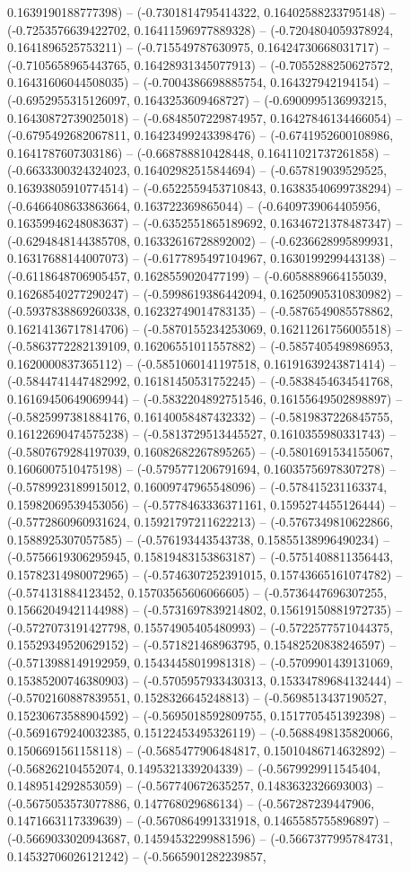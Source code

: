 0.1639190188777398) -- (-0.7301814795414322, 0.16402588233795148) -- (-0.7253576639422702, 0.16411596977889328) -- (-0.7204804059378924, 0.1641896525753211) -- (-0.715549787630975, 0.16424730668031717) -- (-0.7105658965443765, 0.16428931345077913) -- (-0.7055288250627572, 0.16431606044508035) -- (-0.7004386698885754, 0.164327942194154) -- (-0.6952955315126097, 0.1643253609468727) -- (-0.6900995136993215, 0.16430872739025018) -- (-0.6848507229874957, 0.16427846134466054) -- (-0.6795492682067811, 0.16423499243398476) -- (-0.6741952600108986, 0.1641787607303186) -- (-0.668788810428448, 0.16411021737261858) -- (-0.6633300324324023, 0.16402982515844694) -- (-0.657819039529525, 0.16393805910774514) -- (-0.6522559453710843, 0.16383540699738294) -- (-0.6466408633863664, 0.163722369865044) -- (-0.6409739064405956, 0.16359946248083637) -- (-0.6352551865189692, 0.16346721378487347) -- (-0.6294848144385708, 0.16332616728892002) -- (-0.6236628995899931, 0.16317688144007073) -- (-0.6177895497104967, 0.1630199299443138) -- (-0.6118648706905457, 0.1628559020477199) -- (-0.6058889664155039, 0.16268540277290247) -- (-0.5998619386442094, 0.16250905310830982) -- (-0.5937838869260338, 0.16232749014783135) -- (-0.5876549085578862, 0.16214136717814706) -- (-0.5870155234253069, 0.16211261756005518) -- (-0.5863772282139109, 0.16206551011557882) -- (-0.5857405498986953, 0.1620000837365112) -- (-0.5851060141197518, 0.16191639243871414) -- (-0.5844741447482992, 0.16181450531752245) -- (-0.5838454634541768, 0.16169450649069944) -- (-0.5832204892751546, 0.16155649502898897) -- (-0.5825997381884176, 0.16140058487432332) -- (-0.5819837226845755, 0.16122690474575238) -- (-0.5813729513445527, 0.1610355980331743) -- (-0.5807679284197039, 0.16082682267895265) -- (-0.5801691534155067, 0.1606007510475198) -- (-0.5795771206791694, 0.16035756978307278) -- (-0.5789923189915012, 0.16009747965548096) -- (-0.578415231163374, 0.15982069539453056) -- (-0.5778463336371161, 0.1595274455126444) -- (-0.5772860960931624, 0.15921797211622213) -- (-0.5767349810622866, 0.1588925307057585) -- (-0.576193443543738, 0.15855138996490234) -- (-0.5756619306295945, 0.15819483153863187) -- (-0.5751408811356443, 0.15782314980072965) -- (-0.5746307252391015, 0.15743665161074782) -- (-0.574131884123452, 0.15703565606066605) -- (-0.5736447696307255, 0.15662049421144988) -- (-0.5731697839214802, 0.15619150881972735) -- (-0.5727073191427798, 0.15574905405480993) -- (-0.5722577571044375, 0.15529349520629152) -- (-0.571821468963795, 0.15482520838246597) -- (-0.5713988149192959, 0.15434458019981318) -- (-0.5709901439131069, 0.15385200746380903) -- (-0.5705957933430313, 0.15334789684132444) -- (-0.5702160887839551, 0.1528326645248813) -- (-0.5698513437190527, 0.15230673588904592) -- (-0.5695018592809755, 0.1517705451392398) -- (-0.5691679240032385, 0.15122453495326119) -- (-0.5688498135820066, 0.1506691561158118) -- (-0.5685477906484817, 0.15010486714632892) -- (-0.568262104552074, 0.1495321339204339) -- (-0.5679929911545404, 0.1489514292853059) -- (-0.567740672635257, 0.1483632326693003) -- (-0.5675053573077886, 0.147768029686134) -- (-0.567287239447906, 0.1471663117339639) -- (-0.5670864991331918, 0.1465585755896897) -- (-0.5669033020943687, 0.14594532299881596) -- (-0.5667377995784731, 0.14532706026121242) -- (-0.5665901282239857, 